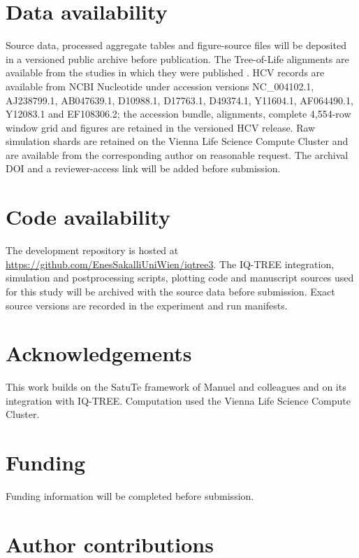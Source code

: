 \section*{Data availability}

Source data, processed aggregate tables and figure-source files will be deposited in a versioned public archive before publication. The Tree-of-Life alignments are available from the studies in which they were published \cite{hug2016,williams2D}. HCV records are available from NCBI Nucleotide under accession versions NC\_004102.1, AJ238799.1, AB047639.1, D10988.1, D17763.1, D49374.1, Y11604.1, AF064490.1, Y12083.1 and EF108306.2; the accession bundle, alignments, complete 4,554-row window grid and figures are retained in the versioned HCV release. Raw simulation shards are retained on the Vienna Life Science Compute Cluster and are available from the corresponding author on reasonable request. The archival DOI and a reviewer-access link will be added before submission.

\section*{Code availability}

The development repository is hosted at \url{https://github.com/EnesSakalliUniWien/iqtree3}. The IQ-TREE integration, simulation and postprocessing scripts, plotting code and manuscript sources used for this study will be archived with the source data before submission. Exact source versions are recorded in the experiment and run manifests.




\section*{Acknowledgements}

This work builds on the SatuTe framework of Manuel and colleagues and on its integration with IQ-TREE. Computation used the Vienna Life Science Compute Cluster.

\section*{Funding}

Funding information will be completed before submission.

\section*{Author contributions}

